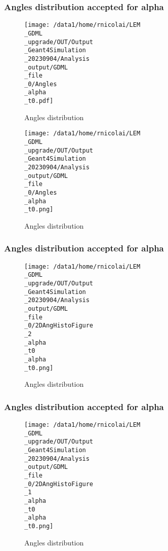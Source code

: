 \documentclass[8pt]{beamer}
\begin{document}
            \begin{frame}
                \frametitle{Angles distribution accepted for alpha}
            
        \begin{figure}[h]
            \centering
            \texttt{[image: /data1/home/rnicolai/LEM\\\_GDML\\\_upgrade/OUT/Output\\\_Geant4Simulation\\\_20230904/Analysis\\\_output/GDML\\\_file\\\_0/Angles\\\_alpha\\\_t0.pdf]}
            \caption{Angles distribution}
        \end{figure}
        
        \begin{figure}[h]
            \centering
            \texttt{[image: /data1/home/rnicolai/LEM\\\_GDML\\\_upgrade/OUT/Output\\\_Geant4Simulation\\\_20230904/Analysis\\\_output/GDML\\\_file\\\_0/Angles\\\_alpha\\\_t0.png]}
            \caption{Angles distribution}
        \end{figure}
        
            \end{frame}
            
            \begin{frame}
                \frametitle{Angles distribution accepted for alpha}
            
        \begin{figure}[h]
            \centering
            \texttt{[image: /data1/home/rnicolai/LEM\\\_GDML\\\_upgrade/OUT/Output\\\_Geant4Simulation\\\_20230904/Analysis\\\_output/GDML\\\_file\\\_0/2DAngHistoFigure\\\_2\\\_alpha\\\_t0\\\_alpha\\\_t0.png]}
            \caption{Angles distribution}
        \end{figure}
        
            \end{frame}
            
            \begin{frame}
                \frametitle{Angles distribution accepted for alpha}
            
        \begin{figure}[h]
            \centering
            \texttt{[image: /data1/home/rnicolai/LEM\\\_GDML\\\_upgrade/OUT/Output\\\_Geant4Simulation\\\_20230904/Analysis\\\_output/GDML\\\_file\\\_0/2DAngHistoFigure\\\_1\\\_alpha\\\_t0\\\_alpha\\\_t0.png]}
            \caption{Angles distribution}
        \end{figure}
        
            \end{frame}
            
\end{document}
